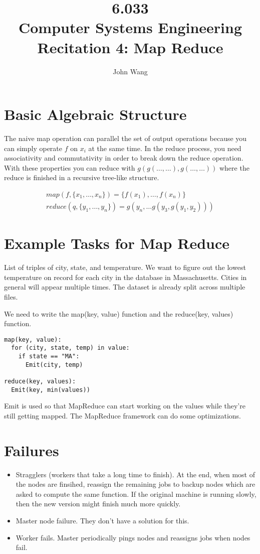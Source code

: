 \documentclass[psamsfonts]{amsart}
\title{6.033 \\
Computer Systems Engineering \\
Recitation 4: Map Reduce}
\author{John Wang}
\begin{document}
\section{Basic Algebraic Structure}

The naive map operation can parallel the set of output operations because you can simply operate $f$ on $x_i$ at the same time. In the reduce process, you need associativity and commutativity in order to break down the reduce operation. With these properties you can reduce with $g(g(\ldots, \ldots), g(\ldots, \ldots))$ where the reduce is finished in a recursive tree-like structure.

\begin{eqnarray}
map(f, \{x_1, \ldots, x_n\}) = \{f(x_1), \ldots, f(x_n) \} \\
reduce(q, \{y_1, \ldots, y_n\}) = g(y_n, \ldots g(y_3, g(y_1, y_2)))
\end{eqnarray}

\section{Example Tasks for Map Reduce}

List of triples of city, state, and temperature. We want to figure out the lowest temperature on record for each city in the database in Massachusetts. Cities in general will appear multiple times. The dataset is already split across multiple files.

We need to write the map(key, value) function and the reduce(key, values) function.

\begin{verbatim}
map(key, value):
  for (city, state, temp) in value:
    if state == "MA":
      Emit(city, temp)

reduce(key, values):
  Emit(key, min(values))
\end{verbatim}

Emit is used so that MapReduce can start working on the values while they're still getting mapped. The MapReduce framework can do some optimizations. 

\section{Failures}

\begin{itemize}
  \item Stragglers (workers that take a long time to finish). At the end, when most of the nodes are finsihed, reassign the remaining jobs to backup nodes which are asked to compute the same function. If the original machine is running slowly, then the new version might finish much more quickly.
  \item Master node failure. They don't have a solution for this.
  \item Worker fails. Master periodically pings nodes and reassigns jobs when nodes fail.
\end{itemize}
\end{document}
